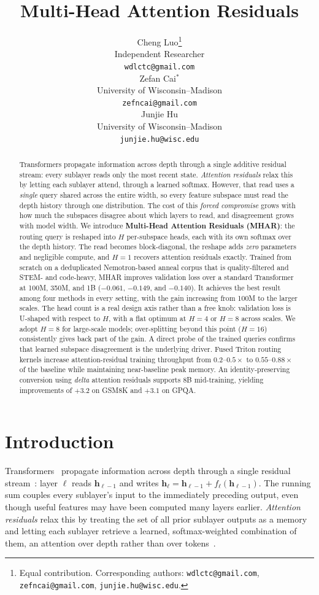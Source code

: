 \documentclass{article}
\title{Multi-Head Attention Residuals}
\author{
  Cheng Luo\thanks{Equal contribution. Corresponding authors:
    \texttt{wdlctc@gmail.com}, \texttt{zefncai@gmail.com},
    \texttt{junjie.hu@wisc.edu}.} \\
  {\small Independent Researcher} \\
  {\small\texttt{wdlctc@gmail.com}} \\
  \And
  Zefan Cai$^*$ \\
  {\small University of Wisconsin--Madison} \\
  {\small\texttt{zefncai@gmail.com}} \\
  \And
  Junjie Hu \\
  {\small University of Wisconsin--Madison} \\
  {\small\texttt{junjie.hu@wisc.edu}} \\
}
\begin{document}
\maketitle

\begin{abstract}
Transformers propagate information across depth through a single additive
residual stream: every sublayer reads only the most recent state.
\emph{Attention residuals} relax this by letting each sublayer attend, through a
learned softmax. However, that read uses a \emph{single} query shared across the
entire width, so every feature subspace must read the depth history through one
distribution. The cost of this \emph{forced compromise} grows with how much
the subspaces disagree about which layers to read, and disagreement grows with
model width. We introduce \textbf{Multi-Head Attention Residuals (MHAR)}: the
routing query is reshaped into $H$ per-subspace heads, each with its own softmax
over the depth history. The read becomes block-diagonal, the reshape adds
\emph{zero} parameters and negligible compute, and $H{=}1$ recovers attention
residuals exactly. Trained from scratch on a deduplicated Nemotron-based
anneal corpus that is quality-filtered and STEM- and code-heavy, MHAR improves
validation loss over a standard Transformer at 100M, 350M, and 1B ($-0.061$,
$-0.149$, and $-0.140$). It achieves the best result among four
methods in every setting, with the gain increasing from 100M to the larger
scales. The head count is a real design axis rather than a free knob:
validation loss is U-shaped with respect to $H$, with a flat optimum at $H{=}4$
or $H{=}8$ across scales. We adopt $H{=}8$ for large-scale models;
over-splitting beyond this point ($H{=}16$) consistently gives back part of
the gain. A direct probe of the trained queries confirms that learned
subspace disagreement is the underlying driver. Fused Triton routing kernels
increase attention-residual training throughput from $0.2$--$0.5\times$ to
$0.55$--$0.88\times$ of the baseline while maintaining near-baseline peak
memory. An identity-preserving conversion using \emph{delta} attention
residuals supports 8B mid-training, yielding improvements of $+3.2$ on GSM8K
and $+3.1$ on GPQA.
\end{abstract}

\section{Introduction}
\label{sec:intro}

Transformers~\citep{vaswani2017attention} propagate information across depth
through a single residual stream~\citep{he2016deep}:
layer $\ell$ reads $\mathbf{h}_{\ell-1}$ and writes
$\mathbf{h}_\ell = \mathbf{h}_{\ell-1} + f_\ell(\mathbf{h}_{\ell-1})$. The
running sum couples every sublayer's input to the immediately preceding output,
even though useful features may have been computed many layers earlier.
\emph{Attention residuals} relax this by treating the set of all prior sublayer
outputs as a memory and letting each sublayer retrieve a learned,
softmax-weighted combination of them, an attention over depth rather than over
tokens~\citep{kimi2025attention}.
\end{document}
